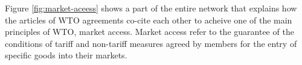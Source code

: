 Figure \ref{fig:market-aceess} shows a part of the entire network that explains how
the articles of WTO agreements co-cite each other to acheive one of the main principles of 
WTO, market access. Market access 
refer to the guarantee of the conditions of
tariff and non-tariff measures 
agreed by members for the entry of specific 
goods into their markets.
